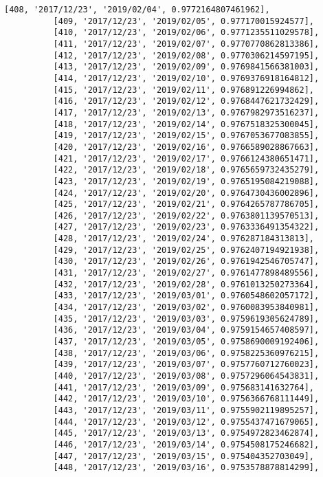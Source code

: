 \documentclass[11pt]{article}
\begin{document}
\begin{Verbatim}[commandchars=\\\{\}]
          [408, '2017/12/23', '2019/02/04', 0.9772164807461962],
          [409, '2017/12/23', '2019/02/05', 0.977170015924577],
          [410, '2017/12/23', '2019/02/06', 0.9771235511029578],
          [411, '2017/12/23', '2019/02/07', 0.9770770862813386],
          [412, '2017/12/23', '2019/02/08', 0.9770306214597195],
          [413, '2017/12/23', '2019/02/09', 0.9769841566381003],
          [414, '2017/12/23', '2019/02/10', 0.9769376918164812],
          [415, '2017/12/23', '2019/02/11', 0.976891226994862],
          [416, '2017/12/23', '2019/02/12', 0.9768447621732429],
          [417, '2017/12/23', '2019/02/13', 0.9767982973516237],
          [418, '2017/12/23', '2019/02/14', 0.9767518325300045],
          [419, '2017/12/23', '2019/02/15', 0.9767053677083855],
          [420, '2017/12/23', '2019/02/16', 0.9766589028867663],
          [421, '2017/12/23', '2019/02/17', 0.9766124380651471],
          [422, '2017/12/23', '2019/02/18', 0.9765659732435279],
          [423, '2017/12/23', '2019/02/19', 0.9765195084219088],
          [424, '2017/12/23', '2019/02/20', 0.9764730436002896],
          [425, '2017/12/23', '2019/02/21', 0.9764265787786705],
          [426, '2017/12/23', '2019/02/22', 0.9763801139570513],
          [427, '2017/12/23', '2019/02/23', 0.9763336491354322],
          [428, '2017/12/23', '2019/02/24', 0.976287184313813],
          [429, '2017/12/23', '2019/02/25', 0.9762407194921938],
          [430, '2017/12/23', '2019/02/26', 0.9761942546705747],
          [431, '2017/12/23', '2019/02/27', 0.9761477898489556],
          [432, '2017/12/23', '2019/02/28', 0.9761013250273364],
          [433, '2017/12/23', '2019/03/01', 0.9760548602057172],
          [434, '2017/12/23', '2019/03/02', 0.9760083953840981],
          [435, '2017/12/23', '2019/03/03', 0.9759619305624789],
          [436, '2017/12/23', '2019/03/04', 0.9759154657408597],
          [437, '2017/12/23', '2019/03/05', 0.9758690009192406],
          [438, '2017/12/23', '2019/03/06', 0.9758225360976215],
          [439, '2017/12/23', '2019/03/07', 0.9757760712760023],
          [440, '2017/12/23', '2019/03/08', 0.9757296064543831],
          [441, '2017/12/23', '2019/03/09', 0.975683141632764],
          [442, '2017/12/23', '2019/03/10', 0.9756366768111449],
          [443, '2017/12/23', '2019/03/11', 0.9755902119895257],
          [444, '2017/12/23', '2019/03/12', 0.9755437471679065],
          [445, '2017/12/23', '2019/03/13', 0.9754972823462874],
          [446, '2017/12/23', '2019/03/14', 0.9754508175246682],
          [447, '2017/12/23', '2019/03/15', 0.975404352703049],
          [448, '2017/12/23', '2019/03/16', 0.9753578878814299],

\end{Verbatim}
\end{document}
